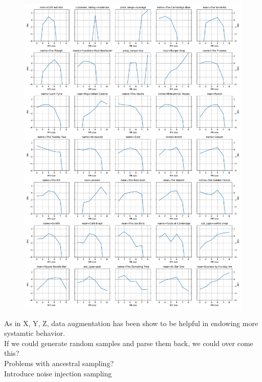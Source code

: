 \begin{figure}[p]
    \includegraphics[width=\textwidth]{nlg/trainpmis.pdf}
\end{figure}

As in X, Y, Z, data augmentation has been show to be helpful in endowing
more systamtic behavior.\\ 



If we could generate random samples and parse them back, we could over come this?\\


Problems with ancestral sampling? \\

Introduce noise injection sampling\\




